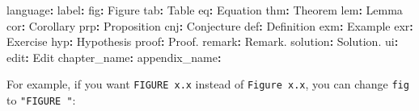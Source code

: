 \documentclass[
  12pt,
]{krantz}
\newenvironment{Shaded}{\begin{snugshade}}{\end{snugshade}}
\newcommand{\AttributeTok}[1]{\textcolor[rgb]{0.77,0.63,0.00}{#1}}
\newcommand{\FunctionTok}[1]{\textcolor[rgb]{0.00,0.00,0.00}{#1}}
\newcommand{\KeywordTok}[1]{\textcolor[rgb]{0.13,0.29,0.53}{\textbf{#1}}}
\newcommand{\StringTok}[1]{\textcolor[rgb]{0.31,0.60,0.02}{#1}}
\theoremstyle{definition}
\theoremstyle{definition}
\theoremstyle{definition}
\theoremstyle{definition}
\theoremstyle{remark}
\begin{document}
\begin{Shaded}
\begin{Highlighting}[]
\FunctionTok{language}\KeywordTok{:}
\AttributeTok{  }\FunctionTok{label}\KeywordTok{:}
\AttributeTok{    }\FunctionTok{fig}\KeywordTok{:}\AttributeTok{ }\StringTok{\textquotesingle{}Figure \textquotesingle{}}
\AttributeTok{    }\FunctionTok{tab}\KeywordTok{:}\AttributeTok{ }\StringTok{\textquotesingle{}Table \textquotesingle{}}
\AttributeTok{    }\FunctionTok{eq}\KeywordTok{:}\AttributeTok{ }\StringTok{\textquotesingle{}Equation \textquotesingle{}}
\AttributeTok{    }\FunctionTok{thm}\KeywordTok{:}\AttributeTok{ }\StringTok{\textquotesingle{}Theorem \textquotesingle{}}
\AttributeTok{    }\FunctionTok{lem}\KeywordTok{:}\AttributeTok{ }\StringTok{\textquotesingle{}Lemma \textquotesingle{}}
\AttributeTok{    }\FunctionTok{cor}\KeywordTok{:}\AttributeTok{ }\StringTok{\textquotesingle{}Corollary \textquotesingle{}}
\AttributeTok{    }\FunctionTok{prp}\KeywordTok{:}\AttributeTok{ }\StringTok{\textquotesingle{}Proposition \textquotesingle{}}
\AttributeTok{    }\FunctionTok{cnj}\KeywordTok{:}\AttributeTok{ }\StringTok{\textquotesingle{}Conjecture \textquotesingle{}}
\AttributeTok{    }\FunctionTok{def}\KeywordTok{:}\AttributeTok{ }\StringTok{\textquotesingle{}Definition \textquotesingle{}}
\AttributeTok{    }\FunctionTok{exm}\KeywordTok{:}\AttributeTok{ }\StringTok{\textquotesingle{}Example \textquotesingle{}}
\AttributeTok{    }\FunctionTok{exr}\KeywordTok{:}\AttributeTok{ }\StringTok{\textquotesingle{}Exercise \textquotesingle{}}
\AttributeTok{    }\FunctionTok{hyp}\KeywordTok{:}\AttributeTok{ }\StringTok{\textquotesingle{}Hypothesis \textquotesingle{}}
\AttributeTok{    }\FunctionTok{proof}\KeywordTok{:}\AttributeTok{ }\StringTok{\textquotesingle{}Proof. \textquotesingle{}}
\AttributeTok{    }\FunctionTok{remark}\KeywordTok{:}\AttributeTok{ }\StringTok{\textquotesingle{}Remark. \textquotesingle{}}
\AttributeTok{    }\FunctionTok{solution}\KeywordTok{:}\AttributeTok{ }\StringTok{\textquotesingle{}Solution. \textquotesingle{}}
\AttributeTok{  }\FunctionTok{ui}\KeywordTok{:}
\AttributeTok{    }\FunctionTok{edit}\KeywordTok{:}\AttributeTok{ Edit}
\AttributeTok{    }\FunctionTok{chapter\_name}\KeywordTok{:}\AttributeTok{ }\StringTok{\textquotesingle{}\textquotesingle{}}
\AttributeTok{    }\FunctionTok{appendix\_name}\KeywordTok{:}\AttributeTok{ }\StringTok{\textquotesingle{}\textquotesingle{}}
\end{Highlighting}
\end{Shaded}

For example, if you want \texttt{FIGURE\ x.x} instead of \texttt{Figure\ x.x}, you can change \texttt{fig} to \texttt{"FIGURE\ "}:
\end{document}
